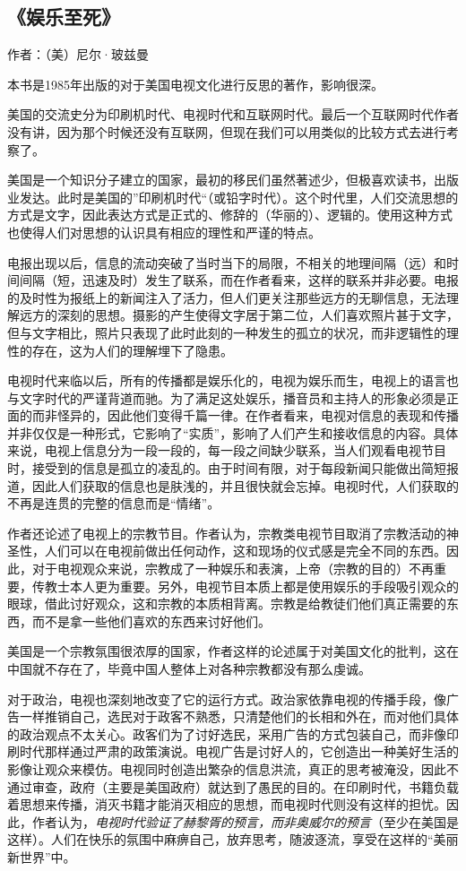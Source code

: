 \subsection{《娱乐至死》}

作者：（美）尼尔·玻兹曼

本书是1985年出版的对于美国电视文化进行反思的著作，影响很深。

美国的交流史分为印刷机时代、电视时代和互联网时代。最后一个互联网时代作者没有讲，因为那个时候还没有互联网，但现在我们可以用类似的比较方式去进行考察了。

美国是一个知识分子建立的国家，最初的移民们虽然著述少，但极喜欢读书，出版业发达。此时是美国的”印刷机时代“（或铅字时代）。这个时代里，人们交流思想的方式是文字，因此表达方式是正式的、修辞的（华丽的）、逻辑的。使用这种方式也使得人们对思想的认识具有相应的理性和严谨的特点。

电报出现以后，信息的流动突破了当时当下的局限，不相关的地理间隔（远）和时间间隔（短，迅速及时）发生了联系，而在作者看来，这样的联系并非必要。电报的及时性为报纸上的新闻注入了活力，但人们更关注那些远方的无聊信息，无法理解远方的深刻的思想。摄影的产生使得文字居于第二位，人们喜欢照片甚于文字，但与文字相比，照片只表现了此时此刻的一种发生的孤立的状况，而非逻辑性的理性的存在，这为人们的理解埋下了隐患。

电视时代来临以后，所有的传播都是娱乐化的，电视为娱乐而生，电视上的语言也与文字时代的严谨背道而驰。为了满足这处娱乐，播音员和主持人的形象必须是正面的而非怪异的，因此他们变得千篇一律。在作者看来，电视对信息的表现和传播并非仅仅是一种形式，它影响了“实质”，影响了人们产生和接收信息的内容。具体来说，电视上信息分为一段一段的，每一段之间缺少联系，当人们观看电视节目时，接受到的信息是孤立的凌乱的。由于时间有限，对于每段新闻只能做出简短报道，因此人们获取的信息也是肤浅的，并且很快就会忘掉。电视时代，人们获取的不再是连贯的完整的信息而是“情绪”。

作者还论述了电视上的宗教节目。作者认为，宗教类电视节目取消了宗教活动的神圣性，人们可以在电视前做出任何动作，这和现场的仪式感是完全不同的东西。因此，对于电视观众来说，宗教成了一种娱乐和表演，上帝（宗教的目的）不再重要，传教士本人更为重要。另外，电视节目本质上都是使用娱乐的手段吸引观众的眼球，借此讨好观众，这和宗教的本质相背离。宗教是给教徒们他们真正需要的东西，而不是拿一些他们喜欢的东西来讨好他们。

美国是一个宗教氛围很浓厚的国家，作者这样的论述属于对美国文化的批判，这在中国就不存在了，毕竟中国人整体上对各种宗教都没有那么虔诚。

对于政治，电视也深刻地改变了它的运行方式。政治家依靠电视的传播手段，像广告一样推销自己，选民对于政客不熟悉，只清楚他们的长相和外在，而对他们具体的政治观点不太关心。政客们为了讨好选民，采用广告的方式包装自己，而非像印刷时代那样通过严肃的政策演说。电视广告是讨好人的，它创造出一种美好生活的影像让观众来模仿。电视同时创造出繁杂的信息洪流，真正的思考被淹没，因此不通过审查，政府（主要是美国政府）就达到了愚民的目的。在印刷时代，书籍负载着思想来传播，消灭书籍才能消灭相应的思想，而电视时代则没有这样的担忧。因此，作者认为，\emph{电视时代验证了赫黎胥的预言，而非奥威尔的预言}（至少在美国是这样）。人们在快乐的氛围中麻痹自己，放弃思考，随波逐流，享受在这样的“美丽新世界”中。

